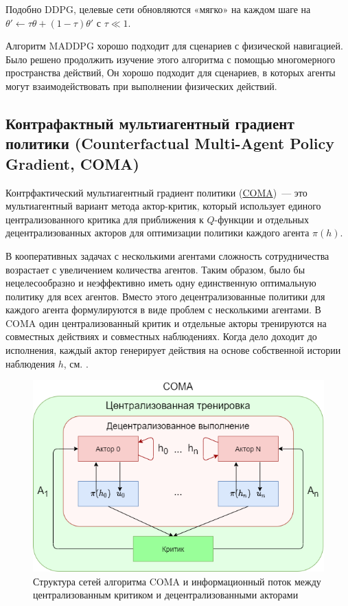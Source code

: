 Подобно DDPG, целевые сети обновляются «мягко» на каждом шаге на ${\theta' \leftarrow \tau \theta + (1 - \tau) \theta'}$ с $\tau \ll 1$.

Алгоритм MADDPG хорошо подходит для сценариев с физической навигацией. Было решено продолжить изучение этого алгоритма с помощью многомерного пространства действий, Он хорошо подходит для сценариев, в которых агенты могут взаимодействовать при выполнении физических действий.

\subsection{Контрафактный мультиагентный градиент политики (Counterfactual Multi-Agent Policy Gradient, COMA)}

Контрфактический мультиагентный градиент политики (\hyperref[acr:coma]{COMA})~--- это мультиагентный вариант метода актор-критик, который использует единого централизованного критика для приближения к $Q$-функции и отдельных децентрализованных акторов для оптимизации политики каждого агента $\pi (h)$. \cite{foerster2017counterfactual}

В кооперативных задачах с несколькими агентами сложность сотрудничества возрастает с увеличением количества агентов. Таким образом, было бы нецелесообразно и неэффективно иметь одну единственную оптимальную политику для всех агентов. Вместо этого децентрализованные политики для каждого агента формулируются в виде проблем с несколькими агентами. В COMA один централизованный критик и отдельные акторы тренируются на совместных действиях и совместных наблюдениях. Когда дело доходит до исполнения, каждый актор генерирует действия на основе собственной истории наблюдения $h$, см. .

\begin{figure}[ht!]
    \center
    \includegraphics [scale=0.80] {my_folder/images/ch2/coma.png}
    \caption{Структура сетей алгоритма COMA и информационный поток между централизованным критиком и децентрализованными акторами \cite{foerster2017counterfactual}}
    \label{fig:ch2-coma}
\end{figure}

